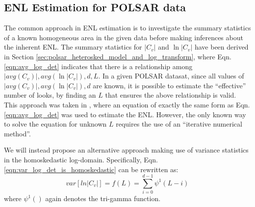 \documentclass[journal]{IEEEtran}
\begin{document}
\subsection{ENL Estimation for POLSAR data}
\label{sec:valid_enl_estimation}

The common approach in ENL estimation is to investigate the summary statistics of a known homogeneous area in the given data
  before making inferences about the inherent ENL.
The summary statistics for $|C_v|$ and $\ln|C_v|$ have been derived in Section \ref{sec:polsar_heterosked_model_and_log_transform},
  where Eqn. \ref{eqn:avg_log_det} indicates that there is a relationship among $|avg(C_v)|,avg(\ln|C_v|),d,L$.
In a given POLSAR datasat, since all values of $|avg(C_v)|,avg(\ln|C_v|),d$ are known,
  it is possible to estimate the ``effective'' number of looks, by finding an $L$ that ensures the above relationship is valid.
This approach was taken in \cite{Anfinsen_2009_TGRS_3795},
  where an equation of exactly the same form as Eqn.  \ref{eqn:avg_log_det} was used to estimate the ENL.
However, the only known way to solve the equation for unknown $L$ requires the use of an ``iterative numerical method''.

We will instead propose an alternative approach making use of variance statistics in the homoskedastic log-domain.
Specifically, Eqn. \ref{eqn:var_log_det_is_homoskedastic} can be rewritten as: 
\begin{equation}
  var \left[ ln|C_v| \right] = f(L) = \sum^{d-1}_{i=0} \psi^1(L-i)
  \label{eqn:expected_sample_var_log_as_function_of_enl}
\end{equation}
where $\psi^1()$ again denotes the tri-gamma function.
\end{document}
